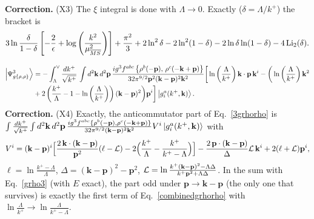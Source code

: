 \documentclass[10pt]{article}
\numberwithin{equation}{section}
\begin{document}
{\color{blue}\noindent\textbf{Correction.} (X3) The $\xi$ integral is done with $\Lambda\to0$. Exactly ($\delta=\Lambda/k^+$) the bracket is
\begin{equation*}
3\ln\frac{\delta}{1-\delta}\left[-\frac{2}{\epsilon}+\log{\left(\frac{k^{2}}{\mu^{2}_{\overline{MS}}}\right)}\right]+\frac{\pi^{2}}{3}+2\ln^2\delta-2\ln^2(1-\delta)-2\ln\delta\ln(1-\delta)-4\,{\rm Li}_2(\delta).
\end{equation*}}

\begin{align}\label{tworho2}
\left|\Psi_{g\{\rho,\rho\}}^{3}\right\rangle & = -\int_{\Lambda}^{\vee}\frac{dk^{+}}{\sqrt{k^{+}}}\,\int d^{2}\mathbf{k}\, d^{2}\mathbf{p}\,\frac{ig^{3}f^{abc}\left\{ \rho^{b}(-\mathbf{p}),\,\rho^{c}(-\mathbf{k}+\mathbf{p})\right\} }{32\pi^{9/2}\mathbf{p}^{2}(\mathbf{k}-\mathbf{p})^{2}\mathbf{k}^{2}}\bigg[\ln\left(\frac{\Lambda}{k^{+}}\right)\mathbf{k}\cdot \mathbf{p}\,\mathbf{k}^{i}-\bigg(\ln\left(\frac{\Lambda}{k^{+}}\right)\mathbf{k}^{2}\notag \\ & +2\left(\frac{k^{+}}{\Lambda}-1-\ln\left(\frac{\Lambda}{k^{+}}\right)\right)(\mathbf{k}-\mathbf{p})^{2}\bigg)\mathbf{p}^{i}\bigg]\left|g_{i}^{a}(k^{+},\mathbf{k})\right\rangle.
\end{align}
{\color{blue}\noindent\textbf{Correction.} (X4) Exactly, the anticommutator part of Eq.~\eqref{3grhorho} is
$\int\frac{dk^{+}}{\sqrt{k^{+}}}\int d^{2}\mathbf{k}\,d^2\mathbf{p}\,\frac{ig^{3}f^{abc}\{\rho^{b}(-\mathbf{p}),\rho^{c}(-\mathbf{k}+\mathbf{p})\}}{32\pi^{9/2}(\mathbf{k}-\mathbf{p})^{2}\mathbf{k}^{2}}V^i\ket{g^a_i(k^+,\mathbf{k})}$ with
\begin{equation*}
V^i=(\mathbf{k}-\mathbf{p})^i\Big[\frac{2\,\mathbf{k}\cdot(\mathbf{k}-\mathbf{p})}{\mathbf{p}^2}(\ell-{\cal L})-2\Big(\frac{k^+}{\Lambda}-\frac{k^+}{k^+-\Lambda}\Big)\Big]-\frac{2\,\mathbf{p}\cdot(\mathbf{k}-\mathbf{p})}{\Delta}{\cal L}\,\mathbf{k}^i+2(\ell+{\cal L})\mathbf{p}^i,
\end{equation*}
$\ell=\ln\frac{k^+-\Lambda}{\Lambda}$, $\Delta=(\mathbf{k}-\mathbf{p})^2-\mathbf{p}^2$, ${\cal L}=\ln\frac{k^+(\mathbf{k}-\mathbf{p})^2-\Lambda\Delta}{k^+\mathbf{p}^2+\Lambda\Delta}$. In the sum with Eq.~\eqref{grho3} (with $E$ exact), the part odd under $\mathbf p\to\mathbf k-\mathbf p$ (the only one that survives) is exactly the first term of Eq.~\eqref{combinedgrhorho} with $\ln\frac{\Lambda}{k^+}\to\ln\frac{\Lambda}{k^+-\Lambda}$.}
\end{document}
